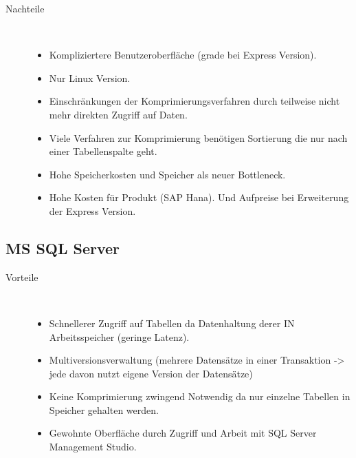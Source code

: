 \documentclass[a4paper, 12pt]{scrartcl}
\begin{document}
\begin{description}
	\item[Nachteile]~\par
	\begin{itemize}
		\item Kompliziertere Benutzeroberfläche (grade bei Express Version).

		\item Nur Linux Version.
		\item Einschränkungen der Komprimierungsverfahren durch teilweise nicht mehr direkten Zugriff auf Daten.
		\item Viele Verfahren zur Komprimierung benötigen Sortierung die nur nach einer Tabellenspalte geht.

		\item Hohe Speicherkosten und Speicher als neuer Bottleneck.

		\item Hohe Kosten für Produkt (SAP Hana). Und Aufpreise bei Erweiterung der Express Version. 
	\end{itemize}
\end{description}

\subsection{MS SQL Server}
\begin{description}
	\item[Vorteile]~\par
	\begin{itemize}
		\item Schnellerer Zugriff auf Tabellen da Datenhaltung derer IN Arbeitsspeicher (geringe Latenz).

		\item Multiversionsverwaltung (mehrere Datensätze in einer Transaktion -> jede davon nutzt eigene Version der Datensätze) 

		\item Keine Komprimierung zwingend Notwendig da nur einzelne Tabellen in Speicher gehalten werden. 

		\item Gewohnte Oberfläche durch Zugriff und Arbeit mit SQL Server Management Studio.
		
	\end{itemize}
\end{description}
\end{document}
